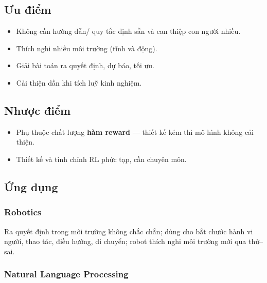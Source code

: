 \subsection{Ưu điểm}

\begin{tinhchat}[title={Ưu điểm}]
\begin{itemize}
  \item Không cần hướng dẫn/ quy tắc định sẵn và can thiệp con người nhiều.
  \item Thích nghi nhiều môi trường (tĩnh và động).
  \item Giải bài toán ra quyết định, dự báo, tối ưu.
  \item Cải thiện dần khi tích luỹ kinh nghiệm.
\end{itemize}
\end{tinhchat}

\subsection{Nhược điểm}

\begin{luuy}[title={Nhược điểm}]
\begin{itemize}
  \item Phụ thuộc chất lượng \textbf{hàm reward} --- thiết kế kém thì mô hình không cải thiện.
  \item Thiết kế và tinh chỉnh RL phức tạp, cần chuyên môn.
\end{itemize}
\end{luuy}

\subsection{Ứng dụng}

\subsubsection{Robotics}

\begin{ynghia}[title={Robotics}]
Ra quyết định trong môi trường không chắc chắn; dùng cho bắt chước hành vi người, thao tác, điều hướng, di chuyển; robot thích nghi môi trường mới qua thử--sai.
\end{ynghia}

\subsubsection{Natural Language Processing}

